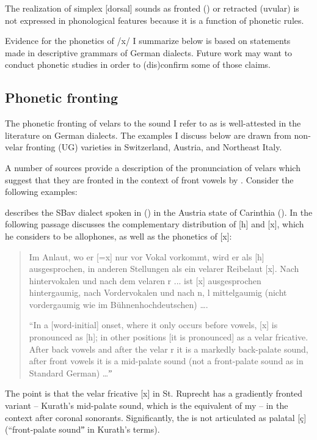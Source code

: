 The realization of simplex [dorsal] sounds as fronted () or retracted (uvular) is not expressed in phonological features because it is a function of phonetic rules.

Evidence for the phonetics of /x/ I summarize below is based on statements made in descriptive grammars of German dialects. Future work may want to conduct phonetic studies in order to (dis)confirm some of those claims.

\subsection{Phonetic fronting}\label{sec:12.9.1}

The phonetic fronting of velars to the sound I refer to as  is well-attested in the literature on German dialects. The examples I discuss below are drawn from non-velar fronting (UG) varieties in Switzerland, Austria, and Northeast Italy.

A number of sources provide a description of the pronunciation of velars which suggest that they are fronted in the context of front vowels by . Consider the following examples:

\citet{Kurath1965} describes the SBav dialect spoken in  () in the Austria state of Carinthia (). In the following passage \citet[32]{Kurath1965} discusses the complementary distribution of [h] and [x], which he considers to be allophones, as well as the phonetics of [x]:

\begin{quote}
Im Anlaut, wo er [=x] nur vor Vokal vorkommt, wird er als [h] aus\-ge\-sproch\-en, in anderen Stellungen als ein velarer Reibelaut [x]. Nach hintervokalen und nach dem velaren r ... ist [x] aus\-ge\-sproch\-en hintergaumig, nach Vordervokalen und nach n, l mittelgaumig (nicht vordergaumig wie im Bühnenhochdeutschen) ….

“In a [word-initial] onset, where it only occurs before vowels, [x] is pronounced as [h]; in other positions [it is pronounced] as a velar fricative. After back vowels and after the velar r it is a markedly back-palate sound, after front vowels it is a mid-palate sound (not a front-palate sound as in Standard German) …ˮ
\end{quote}

The point is that the velar fricative [x] in St. Ruprecht has a gradiently fronted variant -- Kurath’s mid-palate sound, which is the equivalent of my  -- in the context after coronal sonorants. Significantly, the  is not articulated as palatal [ç] (“front-palate soundˮ in Kurath’s terms).

